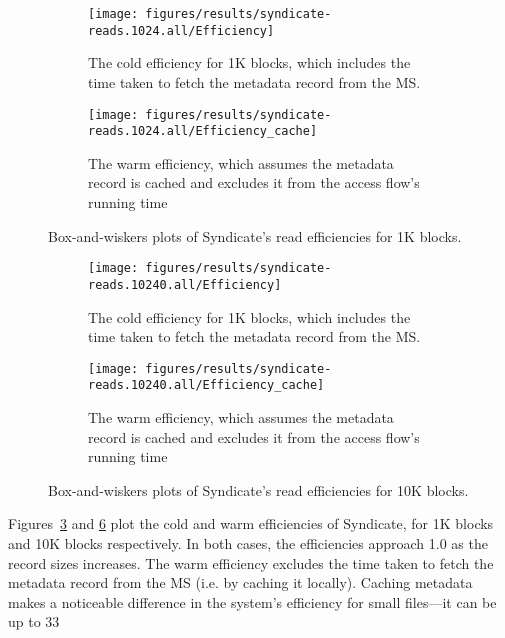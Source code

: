 \begin{figure}[htp!]
   \centering
   \begin{subfigure}[b]{.8\textwidth}
      \texttt{[image: figures/results/syndicate-reads.1024.all/Efficiency]}
      \label{fig:syndicate-cold-efficiency-1k}
      \caption{The cold efficiency for 1K blocks, which includes the time taken to fetch the
      metadata record from the MS.}
   \end{subfigure}
   \begin{subfigure}[b]{.8\textwidth}
      \texttt{[image: figures/results/syndicate-reads.1024.all/Efficiency\_cache]}
      \label{fig:syndicate-warm-efficiency-1k}
      \caption{The warm efficiency, which assumes the metadata record is cached
      and excludes it from the access flow's running time}
   \end{subfigure}
   \caption{Box-and-wiskers plots of Syndicate's read efficiencies for 1K blocks.}
   \label{fig:syndicate-read-efficiencies-1k}
\end{figure}

\begin{figure}[htp!]
   \centering
   \begin{subfigure}[b]{.8\textwidth}
      \texttt{[image: figures/results/syndicate-reads.10240.all/Efficiency]}
      \label{fig:syndicate-cold-efficiency-10k}
      \caption{The cold efficiency for 1K blocks, which includes the time taken to fetch the
      metadata record from the MS.}
   \end{subfigure}
   \begin{subfigure}[b]{.8\textwidth}
      \texttt{[image: figures/results/syndicate-reads.10240.all/Efficiency\_cache]}
      \label{fig:syndicate-warm-efficiency-10k}
      \caption{The warm efficiency, which assumes the metadata record is cached
      and excludes it from the access flow's running time}
   \end{subfigure}
   \caption{Box-and-wiskers plots of Syndicate's read efficiencies for 10K blocks.}
   \label{fig:syndicate-read-efficiencies-10k}
\end{figure}

Figures~\ref{fig:syndicate-read-efficiencies-1k} and
\ref{fig:syndicate-read-efficiencies-10k} plot the cold and warm efficiencies of
Syndicate, for 1K blocks and 10K blocks respectively.  In both cases, the
efficiencies approach 1.0 as the record sizes increases.  The warm efficiency
excludes the time taken to fetch the metadata record from the MS (i.e. by
caching it locally).  Caching metadata makes a noticeable difference in the
system's efficiency for small files---it can be up to 33%

